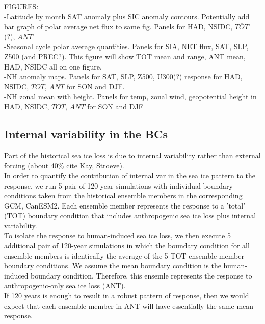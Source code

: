 \documentclass[twocol]{ametsoc}
\begin{document}
FIGURES:\\
-Latitude by month SAT anomaly plus SIC anomaly contours. Potentially add bar graph of polar average net flux to same fig. Panels for HAD, NSIDC, $\overline{TOT}$ (?), $\overline{ANT}$\\
-Seasonal cycle polar average quantities. Panels for SIA, NET flux, SAT, SLP, Z500 (and PREC?). This figure will show TOT mean and range, ANT mean, HAD, NSIDC all on one figure.\\
-NH anomaly maps. Panels for SAT, SLP, Z500, U300(?) response for HAD, NSIDC, $\overline{TOT}$, $\overline{ANT}$ for SON and DJF.\\
-NH zonal mean with height. Panels for temp, zonal wind, geopotential height in HAD, NSIDC, $\overline{TOT}$, $\overline{ANT}$ for SON and DJF \\

\subsection{Internal variability in the BCs}

Part of the historical sea ice loss is due to internal variability rather than external forcing (about 40\% cite Kay, Stroeve). \\
In order to quantify the contribution of internal var in the sea ice pattern to the response, we run 5 pair of 120-year simulations with individual boundary conditions taken from the historical ensemble members in the corresponding GCM, CanESM2. Each ensemble member represents the response to a 'total' (TOT) boundary condition that includes anthropogenic sea ice loss plus internal variability. \\
To isolate the response to human-induced sea ice loss, we then execute 5 additional pair of 120-year simulations in which the boundary condition for all ensemble members is identically the average of the 5 TOT ensemble member boundary conditions. We assume the mean boundary condition is the human-induced boundary condition. Therefore, this ensemle represents the response to anthropogenic-only sea ice loss (ANT).\\
If 120 years is enough to result in a robust pattern of response, then we would expect that each ensemble member in ANT will have essentially the same mean response.\\

\end{document}
